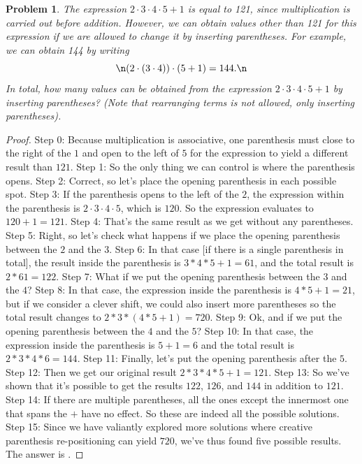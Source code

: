 \documentclass{article}
\newtheorem{theorem}{Problem}
\begin{document}
\begin{theorem}
The expression $2\cdot 3 \cdot 4\cdot 5+1$ is equal to 121, since multiplication is carried out before addition. However, we can obtain values other than 121 for this expression if we are allowed to change it by inserting parentheses. For example, we can obtain 144 by writing \[\n(2\cdot (3\cdot 4)) \cdot (5+1) = 144.\n\]In total, how many values can be obtained from the expression $2\cdot 3\cdot 4 \cdot 5 + 1$ by inserting parentheses? (Note that rearranging terms is not allowed, only inserting parentheses).
\end{theorem}

\begin{proof}
Step 0: Because multiplication is associative, one parenthesis must close to the right of the $1$ and open to the left of $5$ for the expression to yield a different result than $121$.
Step 1: So the only thing we can control is where the parenthesis opens.
Step 2: Correct, so let's place the opening parenthesis in each possible spot.
Step 3: If the parenthesis opens to the left of the $2$, the expression within the parenthesis is $2\cdot 3\cdot 4\cdot 5$, which is $120$. So the expression evaluates to $120+1=121$.
Step 4: That's the same result as we get without any parentheses.
Step 5: Right, so let's check what happens if we place the opening parenthesis between the $2$ and the $3$.
Step 6: In that case [if there is a single parenthesis in total], the result inside the parenthesis is $3*4*5+1=61$, and the total result is $2*61=122$.
Step 7: What if we put the opening parenthesis between the $3$ and the $4$?
Step 8: In that case, the expression inside the parenthesis is $4*5+1=21$, but if we consider a clever shift, we could also insert more parentheses so the total result changes to $2*3*(4*5+1)=720$.
Step 9: Ok, and if we put the opening parenthesis between the $4$ and the $5$?
Step 10: In that case, the expression inside the parenthesis is $5+1=6$ and the total result is $2*3*4*6=144$.
Step 11: Finally, let's put the opening parenthesis after the $5$.
Step 12: Then we get our original result $2*3*4*5+1=121$.
Step 13: So we've shown that it's possible to get the results $122$, $126$, and $144$ in addition to $121$.
Step 14: If there are multiple parentheses, all the ones except the innermost one that spans the $+$ have no effect. So these are indeed all the possible solutions.
Step 15: Since we have valiantly explored more solutions where creative parenthesis re-positioning can yield $720$, we've thus found five possible results. The answer is .
\end{proof}
\end{document}
